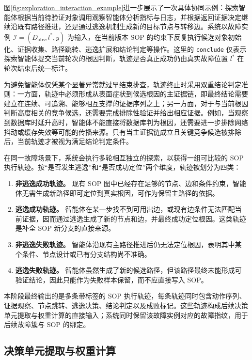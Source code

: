 图\ref{fig:exploration_interaction_example}进一步展示了一次具体协同示例：探索智能体根据当前待验证对象调用观察智能体分析指标与日志，并根据返回证据决定继续沿既有路径推进，还是通过逃逸机制生成新的目标节点与转移边。系统以故障实例 $\mathcal{I}=(D_{\text{obs}},l^{*},y)$ 为输入，在当前版本 SOP 的约束下反复执行候选对象初始化、证据收集、路径跳转、逃逸扩展和结论判定等操作。这里的 \texttt{conclude} 仅表示探索智能体提交当前轮次的根因判断，轨迹是否真正成功仍由真实故障位置 $l^{*}$ 在轮次结束后统一标注。

为避免智能体仅凭某个显著异常就过早结束排查，轨迹终止时采用双重结论判定准则：一方面，轨迹中必须形成从表面症状到候选根因的主证据链，即最终结论需要建立在连续、可追溯、能够相互支撑的证据序列之上；另一方面，对于与当前根因判断高度相关的竞争候选，还需要完成排除性验证并给出相应证据。例如，当观察到数据库时延升高时，智能体不能直接将数据库判为根因，还需要进一步排除网络抖动或缓存失效等可能的传播来源。只有当主证据链成立且关键竞争候选被排除后，当前轨迹才被视为满足结论判定条件。

在同一故障场景下，系统会执行多轮相互独立的探索，以获得一组可比较的 SOP执行轨迹。按“是否发生逃逸”和“是否成功定位”两个维度，轨迹被划分为四类：

\begin{enumerate}[label=（\arabic*）]
    \item \textbf{非逃逸成功轨迹。} 现有 SOP 图中已经存在足够的节点、边和条件约束，智能体无需生成新路径即可定位到真实根因，可作为保留主路径的依据。
    \item \textbf{逃逸成功轨迹。} 智能体在某一步找不到可用出边，或现有边条件无法匹配当前证据，因而通过逃逸生成了新的节点和边，并最终成功定位根因。这类轨迹是补全 SOP 新分支的直接来源。
    \item \textbf{非逃逸失败轨迹。} 智能体沿现有主路径推进后仍无法定位根因，表明其中某个条件、节点设计或已有分支结构尚不准确。
    \item \textbf{逃逸失败轨迹。} 智能体虽然生成了新的候选路径，但该路径最终未能形成可验证结论，因此只能作为失败样本保留，而不应直接写入 SOP。
\end{enumerate}

本阶段最终输出的是多条带标签的 SOP 执行轨迹，每条轨迹同时包含动作序列、证据观察、节点跳转、逃逸决策、结论判定以及成败标记。这些轨迹构成后续决策单元提取与权重计算的直接输入；系统同时保留该故障实例对应的故障指纹，用于后续故障簇与 SOP 的绑定。

\subsection{决策单元提取与权重计算}

